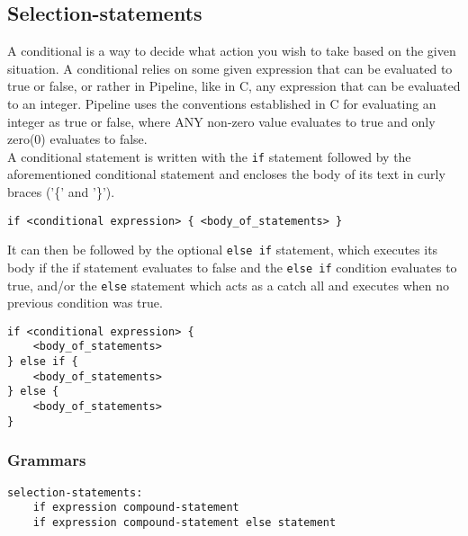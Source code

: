 \documentclass[./LRM_main.tex]{subfiles}
\begin{document}
\subsection{Selection-statements}
A conditional is a way to decide what action you wish to take based on the given situation. A conditional relies on some given expression that can be evaluated to true or false, or rather in Pipeline, like in C, any expression that can be evaluated to an integer. Pipeline uses the conventions established in C for evaluating an integer as true or false, where ANY non-zero value evaluates to true and only zero(0) evaluates to false.\\
A conditional statement is written with the \texttt{if} statement followed by the aforementioned conditional statement and encloses the body of its text in curly braces ('\{' and '\}').
\begin{lstlisting}
if <conditional expression> { <body_of_statements> }
\end{lstlisting}
It can then be followed by the optional \texttt{else if} statement, which executes its body if the if statement evaluates to false and the \texttt{else if} condition evaluates to true, and/or the \texttt{else} statement which acts as a catch all and executes when no previous condition was true.
\begin{lstlisting}
if <conditional expression> {
	<body_of_statements>
} else if {
	<body_of_statements>
} else {
	<body_of_statements>
}
\end{lstlisting}
\subsubsection{Grammars}
\begin{lstlisting}
selection-statements:
	if expression compound-statement
	if expression compound-statement else statement
\end{lstlisting}
\end{document}
